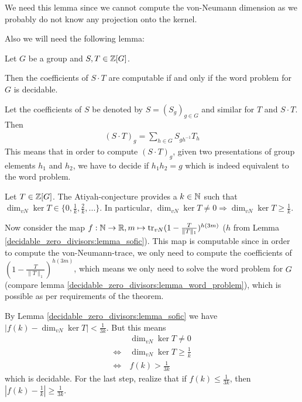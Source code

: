 We need this lemma since we cannot compute the von-Neumann dimension as we probably do not know any projection onto the kernel.

Also we will need the following lemma:
\begin{Lemma}
	\label{decidable_zero_divisors:lemma_word_problem}
	Let $G$ be a group
	and $S,T \in \mathbb{Z}[G]$.

	Then the coefficients of $S \cdot T$ are computable if and only if the word problem for $G$ is decidable.
\end{Lemma}
\proof
	Let the coefficients of $S$ be denoted by $S = (S_g)_{g \in G}$ and similar for $T$ and $S \cdot T$.
	Then
	\begin{align*}
		(S \cdot T)_g = \sum_{h \in G} S_{gh^{-1}} T_h
	\end{align*}
	This means that in order to compute $(S \cdot T)_g$, given two presentations of group elements $h_1$ and $h_2$, we have to decide if $h_1 h_2 = g$ which is indeed equivalent to the word problem.
\endproof

	Let $T \in \mathbb{Z}[G]$.
	The Atiyah-conjecture provides a $k \in \mathbb{N}$ such that $\dim_{vN} \ker T \in \{0, \frac{1}{k},\frac{2}{k},...\}$. %
	In particular, $\dim_{vN} \ker T \neq 0 \Rightarrow \dim_{vN} \ker T \geq \frac1k$.

	Now consider the map $f:\mathbb{N} \to \mathbb{R}, m \mapsto \operatorname{tr}_{vN}(1 - \frac{T}{\|T\|_1})^{h(3m)}$ ($h$ from Lemma \ref{decidable_zero_divisors:lemma_sofic}).
	This map is computable since in order to compute the von-Neumann-trace, we only need to compute the coefficients of $(1 - \frac{T}{\|T\|_1})^{h(3m)}$, which means we only need to solve the word problem for $G$ (compare lemma \ref{decidable_zero_divisors:lemma_word_problem}), which is possible as per requirements of the theorem.

	By Lemma \ref{decidable_zero_divisors:lemma_sofic} we have $|f(k) - \dim_{vN} \ker T| < \frac{1}{3k}$. But this means
	\begin{align*}
		& \dim_{vN} \ker T \neq 0 \\
		\iff~& \dim_{vN} \ker T \geq \frac1k \\
		\iff~& f(k) > \frac{1}{3k}
	\end{align*}
	which is decidable. For the last step, realize that if $f(k) \leq \frac{1}{3k}$, then $|f(k) - \frac1k| \geq \frac{1}{3k}$.
\endproof
